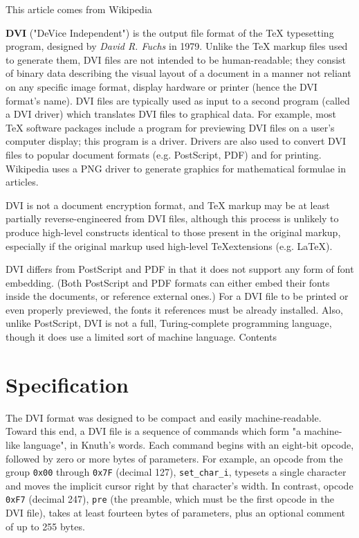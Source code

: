 \documentclass[12pt]{article}
\begin{document}
\begin{center}
\Huge This article comes from Wikipedia
\end{center}

\textbf{DVI} ("DeVice Independent") is the output file format of the TeX
typesetting program, designed by \textit{David R. Fuchs} in 1979. Unlike the TeX
markup files used to generate them, DVI files are not intended to be
human-readable; they consist of binary data describing the visual layout of a
document in a manner not reliant on any specific image format, display hardware
or printer (hence the DVI format's name). DVI files are typically used as input
to a second program (called a DVI driver) which translates DVI files to
graphical data. For example, most TeX software packages include a program for
previewing DVI files on a user's computer display; this program is a driver.
Drivers are also used to convert DVI files to popular document formats (e.g.
PostScript, PDF) and for printing. Wikipedia uses a PNG driver to generate
graphics for mathematical formulae in articles.

DVI is not a document encryption format, and TeX markup may be at least
partially reverse-engineered from DVI files, although this process is unlikely
to produce high-level constructs identical to those present in the original
markup, especially if the original markup used high-level \TeX extensions (e.g.
\LaTeX).

DVI differs from PostScript and PDF in that it does not support any form of
font embedding. (Both PostScript and PDF formats can either embed their fonts
inside the documents, or reference external ones.) For a DVI file to be printed
or even properly previewed, the fonts it references must be already installed.
Also, unlike PostScript, DVI is not a full, Turing-complete programming
language, though it does use a limited sort of machine language.  Contents


\section{Specification}

The DVI format was designed to be compact and easily machine-readable. Toward
this end, a DVI file is a sequence of commands which form "a machine-like
language", in Knuth's words. Each command begins with an eight-bit opcode,
followed by zero or more bytes of parameters. For example, an opcode from the
group \texttt{0x00} through \texttt{0x7F} (decimal 127), \verb|set_char_i|,
typesets a single character and moves the implicit cursor right by that
character's width. In contrast, opcode \texttt{0xF7} (decimal 247), \texttt{pre}
(the preamble, which must be the first opcode in the DVI file), takes at least
fourteen bytes of parameters, plus an optional comment of up to 255 bytes.
\end{document}

